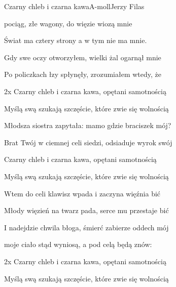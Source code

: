 \begin{song}{Czarny chleb i czarna kawa}{A-moll}{}{Jerzy Filas}{}{}
  \begin{SBVerse}
     pociąg, złe wagony, do więzie wiozą mnie

    Świat ma  cztery strony a w tym  nie ma mnie.
  \end{SBVerse}
  \begin{SBVerse}
    Gdy swe oczy otworzyłem, wielki żal ogarnął mnie

    Po policzkach łzy spłynęły, zrozumiałem wtedy, że
  \end{SBVerse}
  \begin{SBBracket}{2x}
    Czarny chleb i czarna kawa, opętani samotnością

    Myślą swą szukają szczęście, które zwie się wolnością
  \end{SBBracket}
  \begin{SBVerse}
    Młodsza siostra zapytała: mamo gdzie braciszek mój?

    Brat Twój w ciemnej celi siedzi, odsiaduje wyrok swój
  \end{SBVerse}
  \begin{SBChorus}
    Czarny chleb i czarna kawa, opętani samotnością

    Myślą swą szukają szczęście, które zwie się wolnością
  \end{SBChorus}
  \begin{SBVerse}
    Wtem do celi klawisz wpada i zaczyna więźnia bić

    Młody więzień na twarz pada, serce mu przestaje bić
  \end{SBVerse}
  \begin{SBVerse}
    I nadejdzie chwila błoga, śmierć zabierze oddech mój

    moje ciało stąd wyniosą, a pod celą będą znów:
  \end{SBVerse}

  \begin{SBBracket}{2x}
    Czarny chleb i czarna kawa, opętani samotnością

    Myślą swą szukają szczęście, które zwie się wolnością
  \end{SBBracket}
\end{song}
